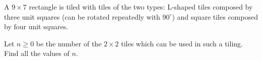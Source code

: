 A $9\times 7$ rectangle is tiled with tiles of the two types: L-shaped tiles composed by three unit squares (can be rotated repeatedly with $90^\circ$) and square tiles composed by four unit squares.

Let $n\ge 0$ be the number of the $2 \times 2 $ tiles which can be used in such a tiling. Find all the values of $n$.